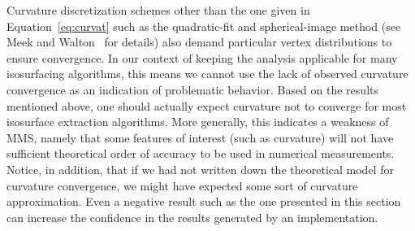 Curvature discretization schemes other than the one given in
Equation~\ref{eq:curvat} such as the quadratic-fit and spherical-image method
(see Meek and Walton~\cite{meek2000} for details) also demand
particular vertex distributions to ensure convergence. In our context
of keeping the analysis applicable for many isosurfacing algorithms,
this means we cannot use the lack of observed curvature convergence as an
indication of problematic behavior. Based on the results
mentioned above, one should actually expect curvature not to converge for most
isosurface extraction algorithms. More generally, this indicates a weakness of
MMS, namely that some features of interest (such as curvature)
will not have sufficient theoretical order of accuracy to be used in numerical
measurements. Notice, in addition, that if we had not written down the
theoretical model for curvature convergence, we might have expected
some sort of curvature approximation. Even a negative result such as
the one presented in this section can increase the confidence in the
results generated by an implementation.


